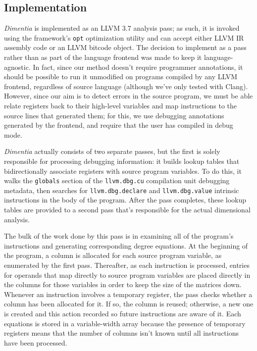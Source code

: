 \documentclass[12pt]{article}
\begin{document}
\subsection{Implementation}

\textit{Dimentia} is implemented as an LLVM 3.7 analysis pass; as such, it is invoked using the framework's \texttt{opt} optimization utility and can accept either LLVM IR assembly code or an LLVM bitcode object.
The decision to implement as a pass rather than as part of the language frontend was made to keep it language-agnostic.
In fact, since our method doesn't require programmer annotations, it should be possible to run it unmodified on programs compiled by any LLVM frontend, regardless of source language (although we've only tested with Clang).
However, since our aim is to detect errors in the source program, we must be able relate registers back to their high-level variables and map instructions to the source lines that generated them; for this, we use debugging annotations generated by the frontend, and require that the user has compiled in debug mode.

\textit{Dimentia} actually consists of two separate passes, but the first is solely responsible for processing debugging information: it builds lookup tables that bidirectionally associate registers with source program variables.
To do this, it walks the \texttt{globals} section of the \texttt{llvm.dbg.cu} compilation unit debugging metadata, then searches for \texttt{llvm.dbg.declare} and \texttt{llvm.dbg.value} intrinsic instructions in the body of the program.
After the pass completes, these lookup tables are provided to a second pass that's responsible for the actual dimensional analysis.

The bulk of the work done by this pass is in examining all of the program's instructions and generating corresponding degree equations.
At the beginning of the program, a column is allocated for each source program variable, as enumerated by the first pass.
Thereafter, as each instruction is processed, entries for operands that map directly to source program variables are placed directly in the columns for those variables in order to keep the size of the matrices down.
Whenever an instruction involves a temporary register, the pass checks whether a column has been allocated for it.
If so, the column is reused; otherwise, a new one is created and this action recorded so future instructions are aware of it.
Each equations is stored in a variable-width array because the presence of temporary registers means that the number of columns isn't known until all instructions have been processed.
\end{document}
